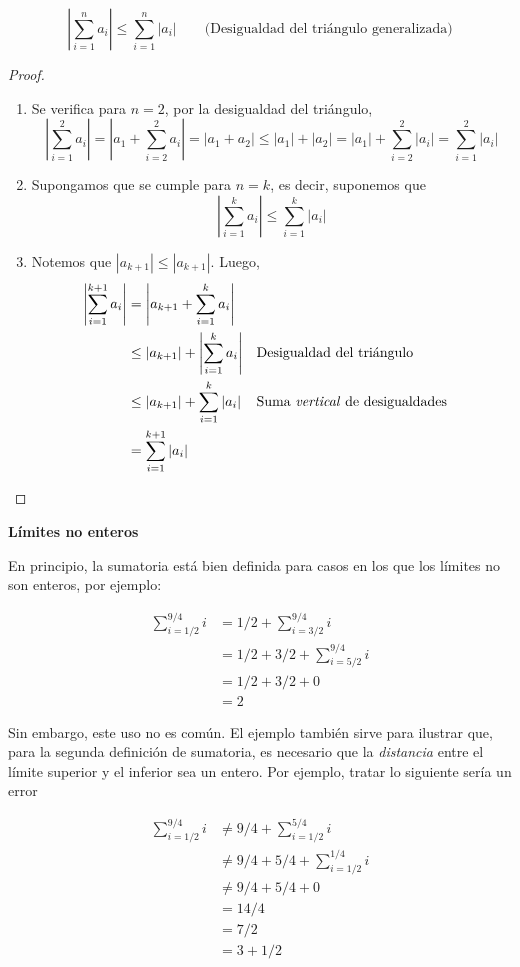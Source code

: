 \[\left| \sum_{i=1}^{n} a_i \right| \leq \sum_{i=1}^{n} |a_i| \qquad \text{(Desigualdad del triángulo generalizada)}\]

\begin{proof}\leavevmode
  \begin{enumerate}[label=\roman*)]
    \item Se verifica para $n=2$, por la desigualdad del triángulo,
    \[\left| \sum_{i=1}^{2} a_i \right| = \left|a_1 + \sum_{i=2}^{2} a_i \right| = |a_1 + a_2| \leq |a_1|+|a_2| = |a_1| + \sum_{i=2}^{2} |a_i| = \sum_{i=1}^{2} |a_i|\]
    \item Supongamos que se cumple para $n=k$, es decir, suponemos que
    \[\left| \sum_{i=1}^{k} a_i \right| \leq \sum_{i=1}^{k} |a_i|\]
    \item Notemos que $|a_{k+1}| \leq |a_{k+1}|$. Luego, 
    \begin{align*}
      \left| \sum_{i=1}^{k+1} a_i \right| &= \left|a_{k+1}+ \sum_{i=1}^{k} a_i \right|\\
      &\leq |a_{k+1}| + \left|\sum_{i=1}^{k} a_i \right| && \text{Desigualdad del triángulo}\\
      &\leq |a_{k+1}| + \sum_{i=1}^{k} |a_i| && \text{Suma \textit{vertical} de desigualdades}\\
      &= \sum_{i=1}^{k+1} |a_i|
    \end{align*}
  \end{enumerate}
\end{proof}

\textbf{Límites no enteros}

En principio, la sumatoria está bien definida para casos en los que los límites no son enteros, por ejemplo:

\begin{align*}
  \sum_{i=1/2}^{9/4} i &= 1/2 + \sum_{i=3/2}^{9/4} i \\
  &= 1/2 + 3/2 + \sum_{i=5/2}^{9/4} i\\
  &= 1/2 + 3/2 + 0\\
  &= 2
\end{align*}

Sin embargo, este uso no es común. El ejemplo también sirve para ilustrar que, para la segunda definición de sumatoria, es necesario que la \textit{distancia} entre el límite superior y el inferior sea un entero. Por ejemplo, tratar lo siguiente sería un error

\begin{align*}
  \sum_{i=1/2}^{9/4} i &\neq 9/4 + \sum_{i=1/2}^{5/4} i\\
  &\neq 9/4 + 5/4 + \sum_{i=1/2}^{1/4} i\\
  &\neq 9/4 + 5/4 + 0\\
  &= 14/4\\
  &= 7/2\\
  &= 3 + 1/2
\end{align*}

